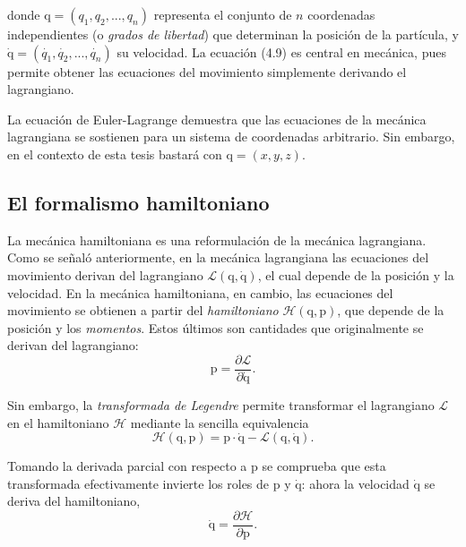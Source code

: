 \noindent
donde $\boldsymbol{\mathrm{q}} = (q_1, q_2,... ,q_n)$ representa el conjunto de $n$ coordenadas independientes (o \textit{grados de libertad}) que determinan la posición de la partícula, y $\boldsymbol{\mathrm{\dot{q}}} = (\dot{q_1}, \dot{q_2},... , \dot{q_n})$ su velocidad. La ecuación (4.9) es central en mecánica, pues permite obtener las ecuaciones del movimiento simplemente derivando el lagrangiano.

La ecuación de Euler-Lagrange demuestra que las ecuaciones de la mecánica lagrangiana se sostienen para un sistema de coordenadas arbitrario. Sin embargo, en el contexto de esta tesis bastará con $\boldsymbol{\mathrm{q}} = (x, y, z)$.

\subsection{El formalismo hamiltoniano}

La mecánica hamiltoniana es una reformulación de la mecánica lagrangiana. Como se señaló anteriormente, en la mecánica lagrangiana las ecuaciones del movimiento derivan del lagrangiano $\mathcal{L}(\boldsymbol{\mathrm{q}}, \boldsymbol{\dot{\mathrm{q}}})$, el cual depende de la posición y la velocidad. En la mecánica hamiltoniana, en cambio, las ecuaciones del movimiento se obtienen a partir del \textit{hamiltoniano} $\mathcal{H}(\boldsymbol{\mathrm{q}}, \boldsymbol{\mathrm{p}})$, que depende de la posición y los \textit{momentos}. Estos últimos son cantidades que originalmente se derivan del lagrangiano:
\begin{equation}
\boldsymbol{\mathrm{p}} = \frac{\partial\mathcal{L}}{\partial\boldsymbol{\dot{\mathrm{q}}}}.
\end{equation}

\noindent
Sin embargo, la \textit{transformada de Legendre} permite transformar el lagrangiano $\mathcal{L}$ en el hamiltoniano $\mathcal{H}$ mediante la sencilla equivalencia
\begin{equation}
\mathcal{H}(\boldsymbol{\mathrm{q}}, \boldsymbol{\mathrm{p}}) = \boldsymbol{\mathrm{p}} \cdot \boldsymbol{\mathrm{\dot{q}}} - \mathcal{L}(\boldsymbol{\mathrm{q}}, \boldsymbol{\dot{\mathrm{q}}}).
\end{equation}

\noindent
Tomando la derivada parcial con respecto a $\boldsymbol{\mathrm{p}}$ se comprueba que esta transformada efectivamente invierte los roles de $\boldsymbol{\mathrm{p}}$ y $\boldsymbol{\dot{\mathrm{q}}}$: ahora la velocidad $\boldsymbol{\dot{\mathrm{q}}}$ se deriva del hamiltoniano,
\begin{equation}
\boldsymbol{\dot{\mathrm{q}}} = \frac{\partial \mathcal{H}}{\partial \boldsymbol{\mathrm{p}}}.
\end{equation}

